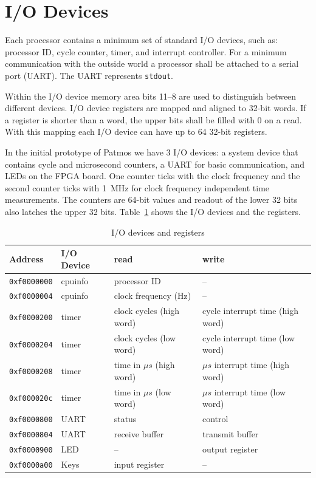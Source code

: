 \documentclass[a4paper,fontsize=10pt,twoside,DIV15,BCOR12mm,headinclude=true,footinclude=false,pagesize,bibtotoc]{scrbook}
\newcommand{\code}[1]{{\texttt{#1}}}
\begin{document}
\section{I/O Devices}
\label{sec:iodevs}

Each processor contains a minimum set of standard I/O devices, such as:
processor ID, cycle counter, timer, and interrupt controller. For a minimum
communication with the outside world a processor shall be attached to a
serial port (UART). The UART represents \code{stdout}.

Within the I/O device memory area bits 11--8 are used to distinguish between different devices.
I/O device registers are mapped and aligned to 32-bit words. If a register is shorter than a word,
the upper bits shall be filled with 0 on a read. With this mapping each I/O device can have up to
64 32-bit registers.

In the initial prototype of Patmos we have 3 I/O devices: a system device that contains cycle and microsecond counters, a UART for basic communication, and LEDs
on the FPGA board. One counter ticks with the clock frequency and the second
counter ticks with 1~MHz for clock frequency independent time measurements.
The counters are 64-bit values and readout of the lower 32 bits also latches the
upper 32 bits.
Table~\ref{tab:iomap} shows the I/O devices and the registers.

\begin{table}
\centering
\begin{tabular}{llll}
\toprule
Address & I/O Device & read & write \\
\midrule
\code{0xf0000000} & cpuinfo & processor ID & -- \\
\code{0xf0000004} & cpuinfo & clock frequency (Hz) & -- \\
\code{0xf0000200} & timer & clock cycles (high word) & cycle interrupt time (high word) \\
\code{0xf0000204} & timer & clock cycles (low word) & cycle interrupt time (low word) \\
\code{0xf0000208} & timer & time in $\mu s$ (high word) & $\mu s$ interrupt time (high word) \\
\code{0xf000020c} & timer & time in $\mu s$ (low word) &  $\mu s$ interrupt time (low word) \\
\code{0xf0000800} & UART & status & control \\
\code{0xf0000804} & UART & receive buffer & transmit buffer \\
\code{0xf0000900} & LED & -- & output register \\
\code{0xf0000a00} & Keys & input register & -- \\
\bottomrule
\end{tabular}
\caption{I/O devices and registers}
\label{tab:iomap}
\end{table}
\end{document}
